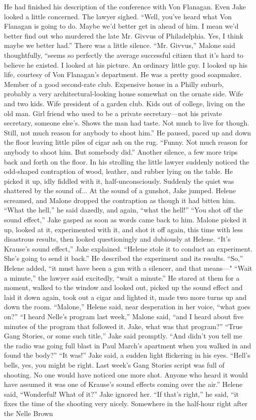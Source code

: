 \documentclass{novel}
\begin{document}
He had finished his description of the conference with Von Flanagan. Even Jake looked a little concerned. The lawyer sighed. “Well, you’ve heard what Von Flanagan is going to do. Maybe we’d better get in ahead of him. I mean we’d better find out who murdered the late Mr. Givvus of Philadelphia. Yes, I think maybe we better had.” There was a little silence. “Mr. Givvus,” Malone said thoughtfully, “seems so perfectly the average successful citizen that it’s hard to believe he existed. I looked at his picture. An ordinary little guy. I looked up his life, courtesy of Von Flanagan’s department. He was a pretty good soapmaker. Member of a good second-rate club. Expensive house in a Philly suburb, probably a very architectural-looking house somewhat on the ornate side. Wife and two kids. Wife president of a garden club. Kids out of college, living on the old man. Girl friend who used to be a private secretary—not his private secretary, someone else’s. Shows the man had taste. Not much to live for though. Still, not much reason for anybody to shoot him.” He paused, paced up and down the floor leaving little piles of cigar ash on the rug. “Funny. Not much reason for anybody to shoot him. But somebody did.” Another silence, a few more trips back and forth on the floor. In his strolling the little lawyer suddenly noticed the odd-shaped contraption of wood, leather, and rubber lying on the table. He picked it up, idly fiddled with it, half-unconsciously. Suddenly the quiet was shattered by the sound of... At the sound of a gunshot, Jake jumped. Helene screamed, and Malone dropped the contraption as though it had bitten him. “What the hell,” he said dazedly, and again, “what the hell!” “You shot off the sound effect,” Jake gasped as soon as words came back to him. Malone picked it up, looked at it, experimented with it, and shot it off again, this time with less disastrous results, then looked questioningly and dubiously at Helene. “It’s Krause’s sound effect,” Jake explained. “Helene stole it to conduct an experiment. She’s going to send it back.” He described the experiment and its results. “So,” Helene added, “it must have been a gun with a silencer, and that means—" “Wait a minute,” the lawyer said excitedly, “wait a minute.” He stared at them for a moment, walked to the window and looked out, picked up the sound effect and laid it down again, took out a cigar and lighted it, made two more turns up and down the room. “Malone,” Helene said, near desperation in her voice, “what goes on?” “I heard Nelle’s program last week,” Malone said, “and I heard about five minutes of the program that followed it. Jake, what was that program?” “True Gang Stories, or some such title,” Jake said promptly. “And didn’t you tell me the radio was going full blast in Paul March’s apartment when you walked in and found the body?” “It was!” Jake said, a sudden light flickering in his eyes. “Hell’s bells, yes, you might be right. Last week’s Gang Stories script was full of shooting. No one would have noticed one more shot. Anyone who heard it would have assumed it was one of Krause’s sound effects coming over the air.” Helene said, “Wonderful! What of it?” Jake ignored her. “If that’s right,” he said, “it fixes the time of the shooting very nicely. Somewhere in the half-hour right after the Nelle Brown 
\end{document}
